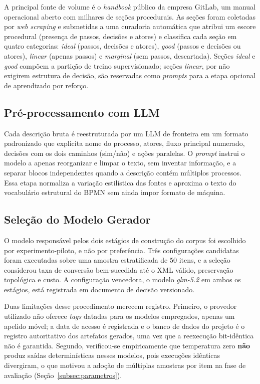 A principal fonte de volume é o \textit{handbook} público da empresa GitLab, um manual operacional aberto com milhares de seções procedurais. As seções foram coletadas por \textit{web scraping} e submetidas a uma curadoria automática que atribui um escore procedural (presença de passos, decisões e atores) e classifica cada seção em quatro categorias: \textit{ideal} (passos, decisões e atores), \textit{good} (passos e decisões ou atores), \textit{linear} (apenas passos) e \textit{marginal} (sem passos, descartada). Seções \textit{ideal} e \textit{good} compõem a partição de treino supervisionado; seções \textit{linear}, por não exigirem estrutura de decisão, são reservadas como \textit{prompts} para a etapa opcional de aprendizado por reforço.

\subsection{Pré-processamento com LLM}
\label{subsec:preprocessamento}

Cada descrição bruta é reestruturada por um LLM de fronteira em um formato padronizado que explicita nome do processo, atores, fluxo principal numerado, decisões com os dois caminhos (sim/não) e ações paralelas. O \textit{prompt} instrui o modelo a apenas reorganizar e limpar o texto, sem inventar informação, e a separar blocos independentes quando a descrição contém múltiplos processos. Essa etapa normaliza a variação estilística das fontes e aproxima o texto do vocabulário estrutural do BPMN sem ainda impor formato de máquina.

\subsection{Seleção do Modelo Gerador}
\label{subsec:selecao-gerador}

O modelo responsável pelos dois estágios de construção do corpus foi escolhido por experimento-piloto, e não por preferência. Três configurações candidatas foram executadas sobre uma amostra estratificada de 50 itens, e a seleção considerou taxa de conversão bem-sucedida até o XML válido, preservação topológica e custo. A configuração vencedora, o modelo \textit{glm-5.2} em ambos os estágios, está registrada em documento de decisão versionado.

Duas limitações desse procedimento merecem registro. Primeiro, o provedor utilizado não oferece \textit{tags} datadas para os modelos empregados, apenas um apelido móvel; a data de acesso é registrada e o banco de dados do projeto é o registro autoritativo dos artefatos gerados, uma vez que a reexecução bit-idêntica não é garantida. Segundo, verificou-se empiricamente que temperatura zero \textbf{não} produz saídas determinísticas nesses modelos, pois execuções idênticas divergiram, o que motivou a adoção de múltiplas amostras por item na fase de avaliação (Seção~\ref{subsec:parametros}).

